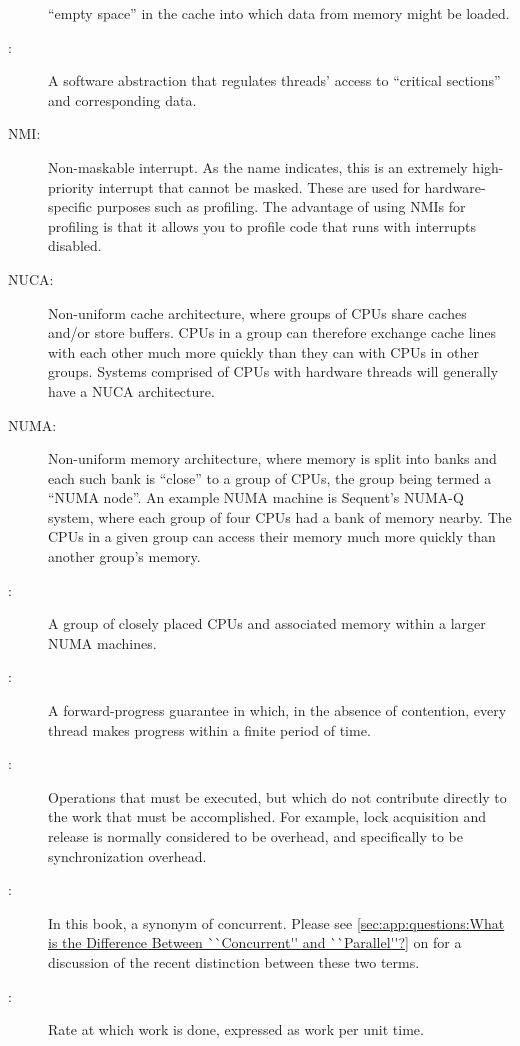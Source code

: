 \begin{description}
	``empty space'' in the cache into which data from memory might
	be loaded.
\item[\IX{Mutual-Exclusion Mechanism}:]
	A software abstraction that regulates threads' access to
	``critical sections'' and corresponding data.
\item[NMI:]
	Non-maskable interrupt.
	As the name indicates, this is an extremely high-priority
	interrupt that cannot be masked.
	These are used for hardware-specific purposes such as profiling.
	The advantage of using NMIs for profiling is that it allows you
	to profile code that runs with interrupts disabled.
\item[NUCA:]
	Non-uniform cache architecture, where groups of CPUs share
	caches and/or store buffers.
	CPUs in a group can therefore exchange cache lines with each
	other much more quickly than they can with CPUs in other groups.
	Systems comprised of CPUs with hardware threads will generally
	have a NUCA architecture.
\item[NUMA:]
	Non-uniform memory architecture, where memory is split into
	banks and each such bank is ``close'' to a group of CPUs,
	the group being termed a ``NUMA node''.
	An example NUMA machine is Sequent's NUMA-Q system, where
	each group of four CPUs had a bank of memory nearby.
	The CPUs in a given group can access their memory much
	more quickly than another group's memory.
\item[\IXaltr{NUMA Node}{NUMA node}:]
	A group of closely placed CPUs and associated memory within
	a larger NUMA machines.
\item[\IX{Obstruction Free}:]
	A forward-progress guarantee in which, in the absence of
	contention, every thread makes progress within a finite
	period of time.
\item[\IX{Overhead}:]
	Operations that must be executed, but which do not contribute
	directly to the work that must be accomplished.
	For example, lock acquisition and release is normally considered
	to be overhead, and specifically to be synchronization overhead.
\item[\IX{Parallel}:]
	In this book, a synonym of concurrent.
	Please see \cref{sec:app:questions:What is the Difference Between ``Concurrent'' and ``Parallel''?}
	on 
	for a discussion of the recent distinction between these two
	terms.
\item[\IX{Performance}:]
	Rate at which work is done, expressed as work per unit time.

\end{description}
